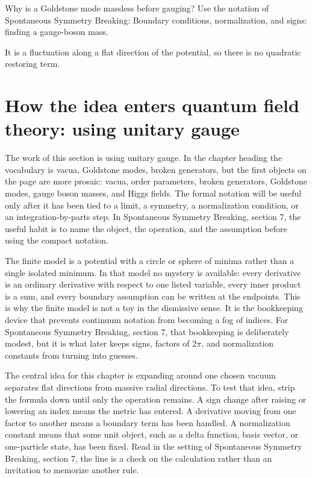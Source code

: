 \begin{exercise}
Why is a Goldstone mode massless before gauging?  Use the notation of Spontaneous Symmetry Breaking: Boundary conditions, normalization, and signs: finding a gauge-boson mass.
\begin{answer}
It is a fluctuation along a flat direction of the potential, so there is no quadratic restoring term.
\end{answer}
\end{exercise}



\section{How the idea enters quantum field theory: using unitary gauge}

The work of this section is using unitary gauge.  In the chapter heading the vocabulary is vacua, Goldstone modes, broken generators, but the first objects on the page are more prosaic: vacua, order parameters, broken generators, Goldstone modes, gauge boson masses, and Higgs fields.  The formal notation will be useful only after it has been tied to a limit, a symmetry, a normalization condition, or an integration-by-parts step.  In Spontaneous Symmetry Breaking, section 7, the useful habit is to name the object, the operation, and the assumption before using the compact notation.

The finite model is a potential with a circle or sphere of minima rather than a single isolated minimum.  In that model no mystery is available: every derivative is an ordinary derivative with respect to one listed variable, every inner product is a sum, and every boundary assumption can be written at the endpoints.  This is why the finite model is not a toy in the dismissive sense.  It is the bookkeeping device that prevents continuum notation from becoming a fog of indices.  For Spontaneous Symmetry Breaking, section 7, that bookkeeping is deliberately modest, but it is what later keeps signs, factors of \(2\pi\), and normalization constants from turning into guesses.

The central idea for this chapter is expanding around one chosen vacuum separates flat directions from massive radial directions.  To test that idea, strip the formula down until only the operation remains.  A sign change after raising or lowering an index means the metric has entered.  A derivative moving from one factor to another means a boundary term has been handled.  A normalization constant means that some unit object, such as a delta function, basis vector, or one-particle state, has been fixed.  Read in the setting of Spontaneous Symmetry Breaking, section 7, the line is a check on the calculation rather than an invitation to memorize another rule.


